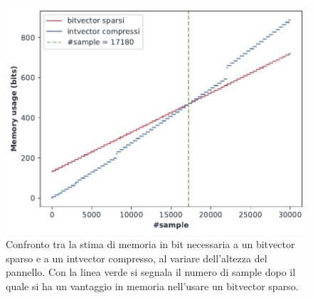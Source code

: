 \begin{figure}
  \centering
  \includegraphics[scale = 0.7]{img/bv_vs_iv.pdf}
  \vspace{-5mm}
  \caption{Confronto tra la stima di memoria in bit necessaria a un bitvector
    sparso e a un 
    intvector compresso, al variare dell'altezza del pannello. Con la linea
    verde si segnala il numero di sample dopo il quale si ha un vantaggio
    in memoria nell'usare un bitvector sparso.}
  \label{fig:bvvsint}
\end{figure}
